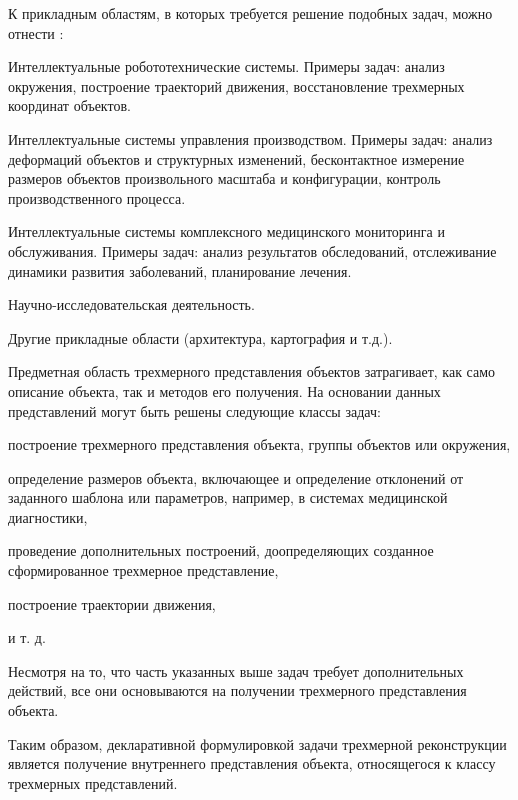 К прикладным областям, в которых требуется решение подобных задач, можно отнести :
\begin{textitemize}
    \item Интеллектуальные робототехнические системы. Примеры задач: анализ окружения, построение траекторий движения, восстановление трехмерных координат объектов.
    \item Интеллектуальные системы управления производством.  Примеры задач: анализ деформаций объектов и структурных изменений, бесконтактное измерение размеров объектов произвольного масштаба и конфигурации, контроль производственного процесса.
    \item Интеллектуальные системы комплексного медицинского мониторинга и обслуживания. Примеры задач: анализ результатов обследований, отслеживание динамики развития заболеваний, планирование лечения.
    \item Научно-исследовательская деятельность.
    \item Другие прикладные области (архитектура, картография и т.д.).
\end{textitemize}

Предметная область трехмерного представления объектов затрагивает, как само описание объекта, так и методов его получения. На основании данных представлений могут быть решены следующие классы задач:

\begin{textitemize}
    \item построение трехмерного представления объекта, группы объектов или окружения,
    \item определение размеров объекта, включающее и определение отклонений от заданного шаблона или параметров, например, в системах медицинской диагностики,
    \item проведение дополнительных построений, доопределяющих созданное сформированное трехмерное представление,
    \item построение траектории движения,
    \item и т. д.
\end{textitemize}

Несмотря на то, что часть указанных выше задач требует дополнительных действий, все они основываются на получении трехмерного представления объекта.

Таким образом, декларативной формулировкой задачи трехмерной реконструкции является получение внутреннего представления объекта, относящегося к классу трехмерных представлений.

